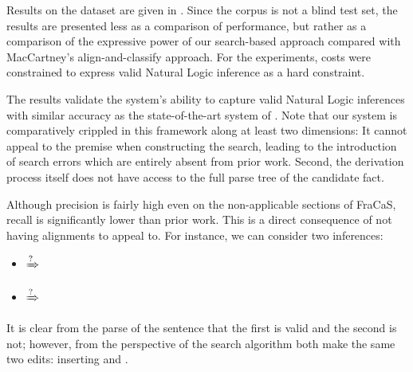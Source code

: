Results on the dataset are given in .
Since the corpus is not a blind test set, the results are presented
  less as a comparison of performance, but rather as a comparison
  of the expressive power of our search-based approach compared with
  MacCartney's align-and-classify approach.
For the experiments, costs were constrained to express valid
  Natural Logic inference as a hard constraint.

The results validate the system's ability to capture valid Natural Logic
  inferences with similar accuracy as the state-of-the-art system of
  .
Note that our system is comparatively crippled in this framework
  along at least two dimensions:
It cannot appeal to the premise when constructing the search,
  leading to the introduction of search errors which are entirely
  absent from prior work.
Second, the derivation process itself does not have access to the
  full parse tree of the candidate fact.

Although precision is fairly high even on the non-applicable
  sections of FraCaS, recall is significantly lower than prior work.
This is a direct consequence of not having alignments to appeal to.
For instance, we can consider two inferences:

\vspace{-0.25em}
\begin{itemize}
\setlength{\itemsep}{-0.5em}
\item[]  $\xRightarrow{?}$ 
\item[]  $\xRightarrow{?}$ 
\end{itemize}
\vspace{-0.25em}

It is clear from the parse of the sentence that the first is valid
  and the second is not; however, from the perspective of the search
  algorithm both make the same two edits: inserting  and .

